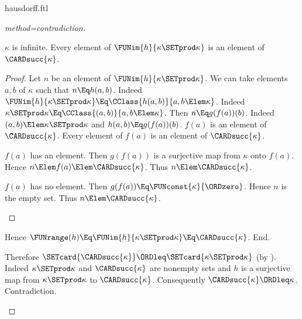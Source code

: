\documentclass{stex}
\begin{document}
\begin{smodule}{hausdorff.ftl}
\begin{forthel}
\begin{proof}[method=contradiction]
\begin{case}{$\kappa$ is infinite.}
        Every element of $\FUNim{h}{\kappa \SETprod \kappa}$ is an element of $\CARDsucc{\kappa}$.
        \begin{proof}
          Let $n$ be an element of $\FUNim{h}{\kappa \SETprod \kappa}$.
          We can take elements $a, b$ of $\kappa$ such that $n \Eq h(a,b)$.
          Indeed $\FUNim{h}{\kappa \SETprod \kappa} \Eq \CClass{h(a,b)}{a,b \Elem\linebreak \kappa}$.
          Indeed $\kappa \SETprod \kappa \Eq \CClass{(a,b)}{a,b \Elem \kappa}$.
          Then $n \Eq g(f(a))(b)$.
          Indeed $(a,b) \Elem \kappa \SETprod \kappa$ and $h(a,b) \Eq g(f(a))(b)$.
          $f(a)$ is an element of $\CARDsucc{\kappa}$.
          Every element of $f(a)$ is an element of $\CARDsucc{\kappa}$.
  
          \begin{case}{$f(a)$ has an element.}
            Then $g(f(a))$ is a surjective map from $\kappa$ onto $f(a)$.
            Hence $n \Elem f(a) \Elem \CARDsucc{\kappa}$.
            Thus $n \Elem \CARDsucc{\kappa}$.
          \end{case}
  
          \begin{case}{$f(a)$ has no element.}
            Then $g(f(a)) \Eq \FUNconst{\kappa}{\ORDzero}$.
            Hence $n$ is the empty set.
            Thus $n \Elem \CARDsucc{\kappa}$.
          \end{case}
        \end{proof}
  
        Hence $\FUNrange(h) \Eq \FUNim{h}{\kappa \SETprod \kappa} \Eq \CARDsucc{\kappa}$.
      End.
  
      Therefore $\SETcard{\CARDsucc{\kappa}} \ORDleq \SETcard{\kappa \SETprod \kappa}$ (by ).
      Indeed $\kappa \SETprod \kappa$ and $\CARDsucc{\kappa}$ are nonempty sets and $h$ is a surjective map from $\kappa \SETprod \kappa$ to $\CARDsucc{\kappa}$.
      Consequently $\CARDsucc{\kappa} \ORDleq \kappa$.
      Contradiction.
    \end{case}
  \end{proof}
\end{forthel}

\printbibliography
{}
\end{smodule}
\end{document}
